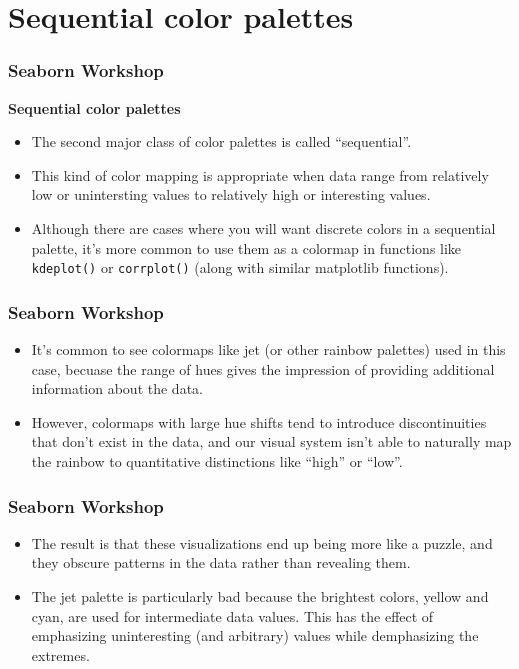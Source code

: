 \documentclass{beamer}
\begin{document}
\section{Sequential color palettes}
\begin{frame}
	\frametitle{Seaborn Workshop}
	\large
	
	\textbf{Sequential color palettes}
	\begin{itemize}
		\item The second major class of color palettes is called “sequential”. 
		\item This kind of color mapping is appropriate when data range from relatively low or unintersting values to relatively high or interesting values. 
		\item Although there are cases where you will want discrete colors in a sequential palette, it’s more common to use them as a colormap in functions like \texttt{kdeplot()} or \texttt{corrplot()} (along with similar matplotlib functions).
	\end{itemize}
	
\end{frame}
\begin{frame}[fragile]
	
	\frametitle{Seaborn Workshop}
	\large
	\begin{itemize}
		\item It’s common to see colormaps like jet (or other rainbow palettes) used in this case, becuase the range of hues gives the impression of providing additional information about the data. 
		\item However, colormaps with large hue shifts tend to introduce discontinuities that don’t exist in the data, and our visual system isn’t able to naturally map the rainbow to quantitative distinctions like “high” or “low”. 
	\end{itemize}
\end{frame}
\begin{frame}[fragile]
	
	\frametitle{Seaborn Workshop}
	\large
	\begin{itemize}
		\item The result is that these visualizations end up being more like a puzzle, and they obscure patterns in the data rather than revealing them. 
		\item The jet palette is particularly bad because the brightest colors, yellow and cyan, are used for intermediate data values. This has the effect of emphasizing uninteresting (and arbitrary) values while demphasizing the extremes.
	\end{itemize}
\end{frame}
\end{document}
